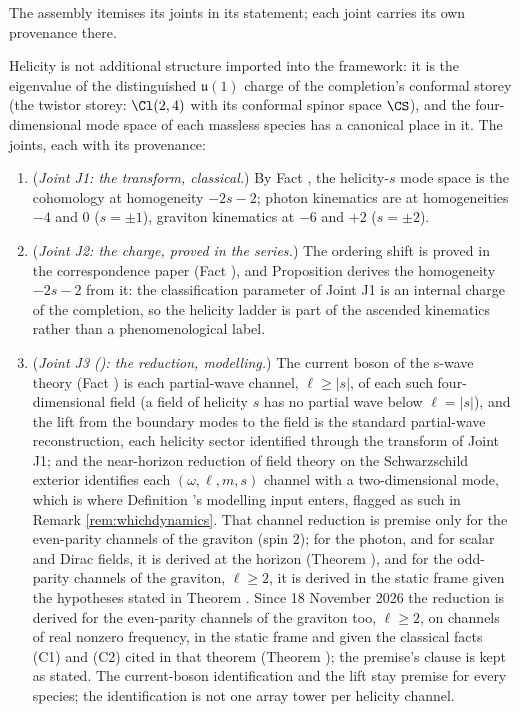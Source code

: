 The assembly itemises its joints in its statement; each joint carries its own provenance there.

Helicity is not additional structure imported into the framework: it is the eigenvalue of the distinguished $\mathfrak{u}(1)$ charge of the completion's conformal storey (the twistor storey: $\Cl(2,4)$ with its conformal spinor space $\CS$), and the four-dimensional mode space of each massless species has a canonical place in it. The joints, each with its provenance:
\begin{enumerate}
\item (\emph{Joint J1: the transform, classical.}) By Fact , the helicity-$s$ mode space is the cohomology at homogeneity $-2s-2$; photon kinematics are at homogeneities $-4$ and $0$ ($s = \pm1$), graviton kinematics at $-6$ and $+2$ ($s = \pm2$).
\item (\emph{Joint J2: the charge, proved in the series.}) The ordering shift is proved in the correspondence paper (Fact ), and Proposition  derives the homogeneity $-2s-2$ from it: the classification parameter of Joint J1 is an internal charge of the completion, so the helicity ladder is part of the ascended kinematics rather than a phenomenological label.
\item (\emph{Joint J3 (): the reduction, modelling.}) The current boson of the s-wave theory (Fact ) is each partial-wave channel, $\ell \geq |s|$, of each such four-dimensional field (a field of helicity $s$ has no partial wave below $\ell = |s|$), and the lift from the boundary modes to the field is the standard partial-wave reconstruction, each helicity sector identified through the transform of Joint J1; and the near-horizon reduction of field theory on the Schwarzschild exterior identifies each $(\omega, \ell, m, s)$ channel with a two-dimensional mode, which is where Definition 's modelling input enters, flagged as such in Remark \ref{rem:whichdynamics}. That channel reduction is premise only for the even-parity channels of the graviton (spin $2$); for the photon, and for scalar and Dirac fields, it is derived at the horizon (Theorem ), and for the odd-parity channels of the graviton, $\ell \geq 2$, it is derived in the static frame given the hypotheses stated in Theorem . Since 18 November 2026 the reduction is derived for the even-parity channels of the graviton too, $\ell \geq 2$, on channels of real nonzero frequency, in the static frame and given the classical facts (C1) and (C2) cited in that theorem (Theorem ); the premise's clause is kept as stated. The current-boson identification and the lift stay premise for every species; the identification is not one array tower per helicity channel.
\end{enumerate}
